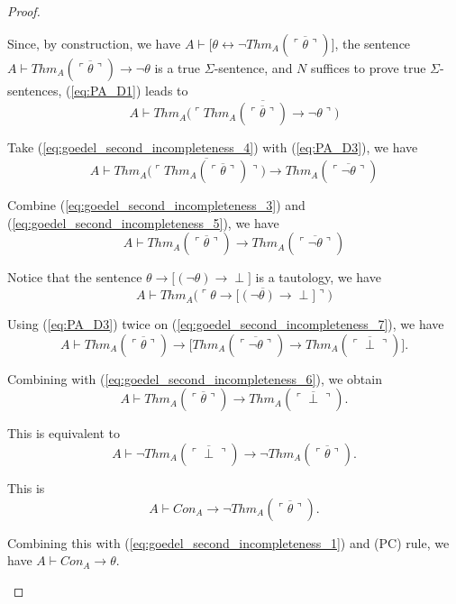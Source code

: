\documentclass[11pt,letterpaper]{book}
\theoremstyle{definition}
\begin{document}
\begin{proof}
\begin{itemize}
{Since, by construction, we have $A \vdash \bigg[ \theta \leftrightarrow \lnot Thm_A ( \overline{\ulcorner \theta \urcorner} ) \bigg]$, the sentence $A \vdash Thm_A ( \overline{\ulcorner \theta \urcorner} ) \rightarrow \lnot \theta $ is a true $\Sigma$-sentence, and $N$ suffices to prove true $\Sigma$-sentences, (\ref{eq:PA_D1}) leads to
\begin{equation}
A \vdash Thm_A \bigg( \overline{\ulcorner Thm_A ( \overline{\ulcorner \theta \urcorner} ) \rightarrow \lnot \theta \urcorner} \bigg)
\label{eq:goedel_second_incompleteness_4}
\end{equation}

Take (\ref{eq:goedel_second_incompleteness_4}) with (\ref{eq:PA_D3}), we have
\begin{equation}
A \vdash Thm_A \bigg( \overline{\ulcorner Thm_A ( \overline{\ulcorner \theta \urcorner} )\urcorner} \bigg) \rightarrow Thm_A (\overline{\ulcorner \lnot \theta \urcorner})
\label{eq:goedel_second_incompleteness_5}
\end{equation}

Combine (\ref{eq:goedel_second_incompleteness_3}) and (\ref{eq:goedel_second_incompleteness_5}), we have
\begin{equation}
A \vdash Thm_A (\overline{\ulcorner \theta \urcorner}) \rightarrow Thm_A (\overline{\ulcorner \lnot \theta \urcorner})
\label{eq:goedel_second_incompleteness_6}
\end{equation}

Notice that the sentence $\theta \rightarrow \big[(\lnot \theta) \rightarrow \perp  \big]$ is a tautology, we have
\begin{equation}
A \vdash Thm_A \bigg( \overline{\ulcorner \theta \rightarrow \big[(\lnot \theta) \rightarrow \perp  \big] \urcorner} \bigg)
\label{eq:goedel_second_incompleteness_7}
\end{equation}

Using (\ref{eq:PA_D3}) twice on (\ref{eq:goedel_second_incompleteness_7}), we have
$$ A \vdash Thm_A (\overline{\ulcorner \theta \urcorner}) \rightarrow \big[ Thm_A (\overline{\ulcorner \lnot \theta \urcorner}) \rightarrow Thm_A (\overline{\ulcorner \perp \urcorner}) \big] .$$

Combining with (\ref{eq:goedel_second_incompleteness_6}), we obtain
$$A \vdash  Thm_A (\overline{\ulcorner \theta \urcorner}) \rightarrow Thm_A (\overline{\ulcorner \perp \urcorner}) .$$

This is equivalent to
$$ A \vdash \lnot Thm_A (\overline{\ulcorner \perp \urcorner}) \rightarrow \lnot Thm_A (\overline{\ulcorner \theta \urcorner}) .$$

This is 
$$ A \vdash Con_A \rightarrow \lnot Thm_A (\overline{\ulcorner \theta \urcorner}) .$$

Combining this with (\ref{eq:goedel_second_incompleteness_1}) and (PC) rule, we have
$A \vdash Con_A \rightarrow \theta$.
}
\end{itemize}

\end{proof}
\end{document}
